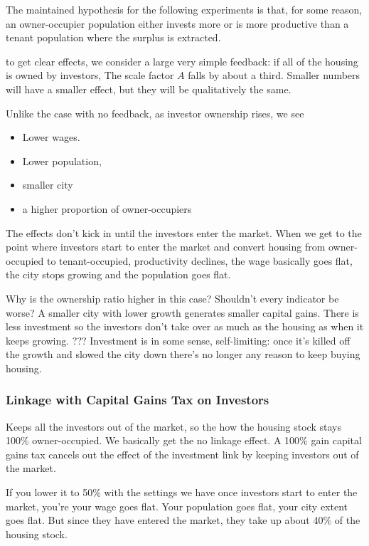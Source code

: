 \documentclass[]{article}
\begin{document}
The maintained hypothesis for the following experiments is that, for some reason, an owner-occupier population either invests more or is more productive than a tenant population where the surplus is extracted. 

to get clear effects, we consider a large very simple feedback: if all of the housing is owned by investors, The scale factor $A$  falls by about a third.  Smaller numbers will have a smaller effect, but they will be qualitatively the same. 

Unlike the case with no feedback, as investor ownership rises,  we see

\begin{itemize}
    \item Lower wages.
    \item Lower population,
    \item smaller city
    \item a higher proportion of owner-occupiers
\end{itemize}
The effects don’t kick in until the investors enter the market. When we get to the point where investors start to enter the market and convert housing from owner-occupied to tenant-occupied, productivity declines, the wage basically goes flat, the city stops growing and the population goes flat.

Why is the ownership ratio higher in this case? Shouldn't every indicator be worse?  A smaller city with lower growth generates smaller capital gains. There is less investment so the investors don’t take over as much as the housing as when it keeps growing.
??? Investment is in some sense, self-limiting: once it’s killed off the growth and slowed the city down there’s no longer any reason to keep buying housing.

\subsubsection{Linkage with Capital Gains Tax on Investors}

Keeps all the investors out of the market, so the how the housing stock stays 100\% owner-occupied. We basically get the no linkage effect. A 100\% gain capital gains tax cancels out the effect of the investment link by keeping investors out of the market.

If you lower it to 50\% with the settings we have once investors start to enter the market, you’re your wage goes flat. Your population goes flat, your city extent goes flat. But since they have entered the market, they take up about 40\% of the housing stock.
\end{document}
